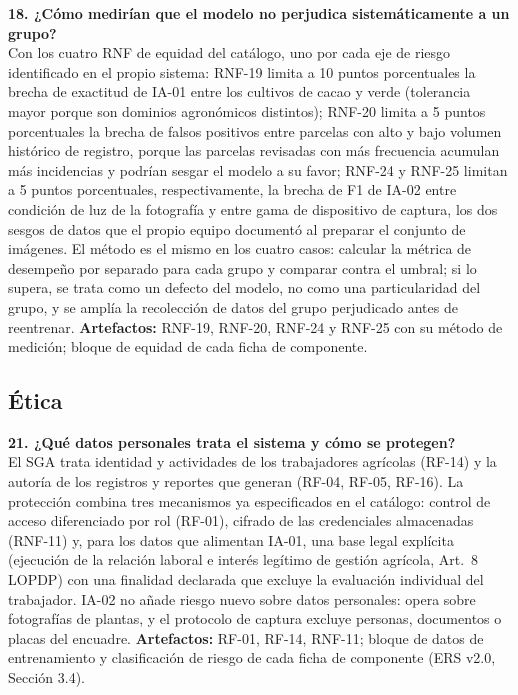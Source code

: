 \medskip
\noindent\textbf{18. ¿Cómo medirían que el modelo no perjudica sistemáticamente a un grupo?}\\
Con los cuatro RNF de equidad del catálogo, uno por cada eje de riesgo identificado en el propio sistema: RNF-19 limita a 10 puntos porcentuales la brecha de exactitud de IA-01 entre los cultivos de cacao y verde (tolerancia mayor porque son dominios agronómicos distintos); RNF-20 limita a 5 puntos porcentuales la brecha de falsos positivos entre parcelas con alto y bajo volumen histórico de registro, porque las parcelas revisadas con más frecuencia acumulan más incidencias y podrían sesgar el modelo a su favor; RNF-24 y RNF-25 limitan a 5 puntos porcentuales, respectivamente, la brecha de F1 de IA-02 entre condición de luz de la fotografía y entre gama de dispositivo de captura, los dos sesgos de datos que el propio equipo documentó al preparar el conjunto de imágenes. El método es el mismo en los cuatro casos: calcular la métrica de desempeño por separado para cada grupo y comparar contra el umbral; si lo supera, se trata como un defecto del modelo, no como una particularidad del grupo, y se amplía la recolección de datos del grupo perjudicado antes de reentrenar. \textbf{Artefactos:} RNF-19, RNF-20, RNF-24 y RNF-25 con su método de medición; bloque de equidad de cada ficha de componente.

\subsection*{Ética}

\noindent\textbf{21. ¿Qué datos personales trata el sistema y cómo se protegen?}\\
El SGA trata identidad y actividades de los trabajadores agrícolas (RF-14) y la autoría de los registros y reportes que generan (RF-04, RF-05, RF-16). La protección combina tres mecanismos ya especificados en el catálogo: control de acceso diferenciado por rol (RF-01), cifrado de las credenciales almacenadas (RNF-11) y, para los datos que alimentan IA-01, una base legal explícita (ejecución de la relación laboral e interés legítimo de gestión agrícola, Art.~8 LOPDP) con una finalidad declarada que excluye la evaluación individual del trabajador. IA-02 no añade riesgo nuevo sobre datos personales: opera sobre fotografías de plantas, y el protocolo de captura excluye personas, documentos o placas del encuadre. \textbf{Artefactos:} RF-01, RF-14, RNF-11; bloque de datos de entrenamiento y clasificación de riesgo de cada ficha de componente (ERS v2.0, Sección 3.4).


